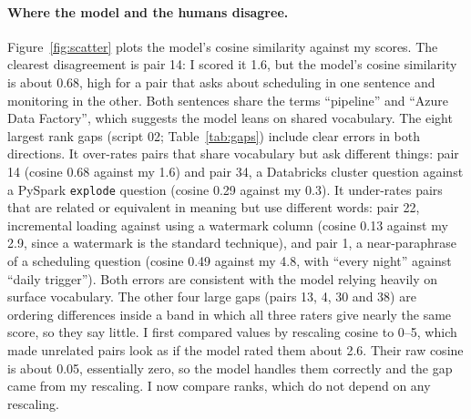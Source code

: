 \documentclass[11pt]{article}
\begin{document}
\paragraph{Where the model and the humans disagree.}
Figure~\ref{fig:scatter} plots the model's cosine similarity against my scores. The clearest disagreement is pair 14: I scored it 1.6, but the model's cosine similarity is about 0.68, high for a pair that asks about scheduling in one sentence and monitoring in the other. Both sentences share the terms ``pipeline'' and ``Azure Data Factory'', which suggests the model leans on shared vocabulary. The eight largest rank gaps (script 02; Table~\ref{tab:gaps}) include clear errors in both directions. It over-rates pairs that share vocabulary but ask different things: pair 14 (cosine 0.68 against my 1.6) and pair 34, a Databricks cluster question against a PySpark \texttt{explode} question (cosine 0.29 against my 0.3). It under-rates pairs that are related or equivalent in meaning but use different words: pair 22, incremental loading against using a watermark column (cosine 0.13 against my 2.9, since a watermark is the standard technique), and pair 1, a near-paraphrase of a scheduling question (cosine 0.49 against my 4.8, with ``every night'' against ``daily trigger''). Both errors are consistent with the model relying heavily on surface vocabulary. The other four large gaps (pairs 13, 4, 30 and 38) are ordering differences inside a band in which all three raters give nearly the same score, so they say little. I first compared values by rescaling cosine to 0--5, which made unrelated pairs look as if the model rated them about 2.6. Their raw cosine is about 0.05, essentially zero, so the model handles them correctly and the gap came from my rescaling. I now compare ranks, which do not depend on any rescaling.
\end{document}

